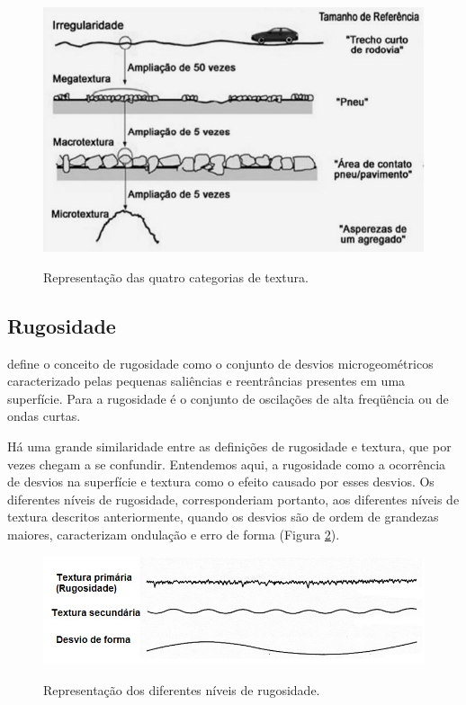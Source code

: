 \begin{figure}[!ht]
\centering
\caption{Representação das quatro categorias de textura.} 
{\includegraphics[scale=.70]{figures/tipos_textura.jpg}}\\
 \label{Fig:tipos_textura}
\end{figure}

\subsection{Rugosidade}
 define o conceito de rugosidade como o  conjunto de desvios microgeométricos caracterizado pelas pequenas saliências e reentrâncias presentes em uma superfície. Para  a rugosidade é o conjunto de oscilações de alta freqüência ou de ondas curtas.

Há uma grande similaridade entre as definições de rugosidade e textura, que por vezes chegam a se confundir. Entendemos aqui, a rugosidade como a ocorrência de desvios na superfície e textura como o efeito causado por esses desvios. Os diferentes níveis de rugosidade, corresponderiam portanto, aos diferentes níveis de textura descritos anteriormente, quando os desvios são de ordem de grandezas maiores, caracterizam ondulação e erro de forma (Figura \ref{Fig:rugosidade}). 

\begin{figure}[!ht]
\centering
\caption{Representação dos diferentes níveis de rugosidade.}
{\includegraphics[scale=.70]{figures/rugosidade.jpg}}\\
 \label{Fig:rugosidade}
\end{figure}

